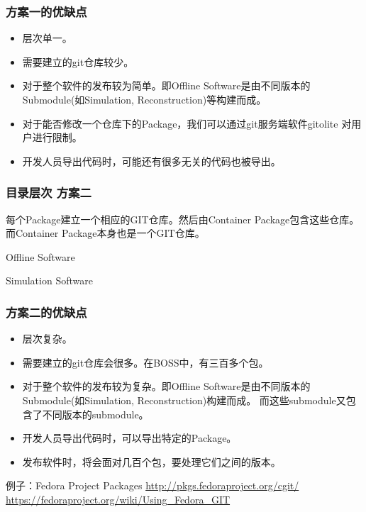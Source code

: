 \begin{frame}
    \frametitle{方案一的优缺点}
    \begin{itemize}
        \item 层次单一。
        \item 需要建立的git仓库较少。
        \item 对于整个软件的发布较为简单。即Offline Software是由不同版本的
              Submodule(如Simulation, Reconstruction)等构建而成。
        \item 对于能否修改一个仓库下的Package，我们可以通过git服务端软件gitolite
              对用户进行限制。
        \item 开发人员导出代码时，可能还有很多无关的代码也被导出。
    \end{itemize}
\end{frame}

\begin{frame}
    \frametitle{目录层次 方案二}
    每个Package建立一个相应的GIT仓库。然后由Container Package包含这些仓库。
    而Container Package本身也是一个GIT仓库。
    \renewcommand*\DTstylecomment{\rmfamily\color{red}\textsc}
    \begin{block}{Offline Software}
    \end{block}

    \begin{block}{Simulation Software}
    \end{block}
\end{frame}

\begin{frame}
    \frametitle{方案二的优缺点}
    \begin{itemize}
        \item 层次复杂。
        \item 需要建立的git仓库会很多。在BOSS中，有三百多个包。
        \item 对于整个软件的发布较为复杂。即Offline Software是由不同版本的
              Submodule(如Simulation, Reconstruction)构建而成。
              而这些submodule又包含了不同版本的submodule。
        \item 开发人员导出代码时，可以导出特定的Package。
        \item 发布软件时，将会面对几百个包，要处理它们之间的版本。
    \end{itemize}
    \begin{block}{例子：Fedora Project Packages}
        \url{http://pkgs.fedoraproject.org/cgit/}
        \url{https://fedoraproject.org/wiki/Using\_Fedora\_GIT}
    \end{block}
\end{frame}

